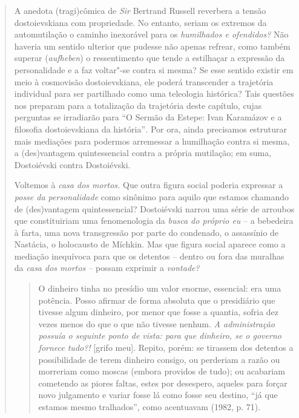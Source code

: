 {\begin{quote}
A anedota (tragi)cômica de \emph{Sir} Bertrand Russell reverbera a
tensão dostoievskiana com propriedade. No entanto, seriam os extremos da
automutilação o caminho inexorável para os \emph{humilhados e
ofendidos?} Não haveria um sentido ulterior que pudesse não apenas
refrear, como também superar (\emph{aufheben}) o ressentimento que tende
a estilhaçar a expressão da personalidade e a faz voltar"-se contra si
mesma? Se esse sentido existir em meio à cosmovisão dostoievskiana, ele
poderá transcender a trajetória individual para ser partilhado como uma
teleologia histórica? Tais questões nos preparam para a totalização da
trajetória deste capítulo, cujas perguntas se irradiarão para ``O Sermão
da Estepe: Ivan Karamázov e a filosofia dostoievskiana da
história''\emph{.} Por ora, ainda precisamos estruturar mais mediações
para podermos arremessar a humilhação contra si mesma, a (des)vantagem
quintessencial contra a própria mutilação; em suma, Dostoiévski contra
Dostoiévski.

Voltemos à \emph{casa dos mortos.} Que outra figura social poderia
expressar a \emph{posse da personalidade} como sinônimo para aquilo que
estamos chamando de (des)vantagem quintessencial? Dostoiévski narrou uma
série de arroubos que constituiriam uma fenomenologia da \emph{busca do
próprio eu} -- a bebedeira à farta, uma nova transgressão por parte do
condenado, o assassínio de Nastácia, o holocausto de Míchkin. Mas que
figura social aparece como a mediação inequívoca para que os detentos --
dentro ou fora das muralhas da \emph{casa dos mortos --} possam exprimir
a \emph{vontade?}

\begin{quote}
O dinheiro tinha no presídio um valor enorme, essencial: era uma
potência. Posso afirmar de forma absoluta que o presidiário que tivesse
algum dinheiro, por menor que fosse a quantia, sofria dez vezes menos do
que o que não tivesse nenhum. \emph{A administração possuía o seguinte
ponto de vista: para que dinheiro, se o governo fornece tudo?!} {[}grifo
meu{]}. Repito, porém: se tirassem dos detentos a possibilidade de terem
dinheiro consigo, ou perderiam a razão ou morreriam como moscas (embora
providos de tudo); ou acabariam cometendo as piores faltas, estes por
desespero, aqueles para forçar novo julgamento e variar fosse lá como
fosse seu destino, ``já que estamos mesmo tralhados'', como acentuavam
(1982, p. 71).
\end{quote}


\end{quote}}
